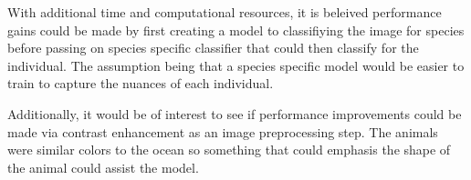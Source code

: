 \documentclass{article}
\begin{document}
With additional time and computational resources, it is beleived performance gains could be made by first creating a model to classifiying the image for 
species before passing on species specific classifier that could then classify for the individual. The assumption being that a species specific model would
be easier to train to capture the nuances of each individual.


Additionally, it would be of interest to see if performance improvements could be made via contrast enhancement as an image preprocessing step. The animals were 
similar colors to the ocean so something that could emphasis the shape of the animal could assist the model.





\end{document}
